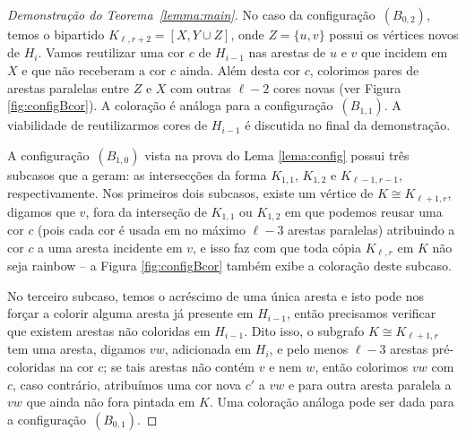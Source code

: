 \documentclass[12pt,a4paper]{book}
\newcommand{\K}{K_{\ell,r}} %
\begin{document}
\begin{proof}[Demonstração do Teorema~\ref{lemma:main}]
	  No caso da configuração~\hyperlink{HconfigB}{$(B_{0,2})$},
   temos  o bipartido $K_{\ell, r+2} = [X, Y \cup Z]$, onde $Z = \{u,v\}$ possui os vértices novos de $H_i$.
   Vamos reutilizar uma cor $c$ de $H_{i-1}$ nas arestas de $u$ e $v$ que incidem em $X$ e que não receberam a cor $c$ ainda.
   Além desta cor $c$, colorimos pares de arestas paralelas entre $Z$ e $X$ com outras $\ell-2$ cores novas (ver Figura \ref{fig:configBcor}).   
        A coloração é análoga para a configuração~\hyperlink{HconfigB}{$(B_{1,1})$}. 
        A viabilidade de reutilizarmos cores de $H_{i-1}$ é discutida no final da demonstração.

        
       A configuração~\hyperlink{HconfigB}{$(B_{1,0})$} vista na prova do Lema \ref{lema:config} possui três subcasos que a geram: 
       as intersecções da forma $K_{1,1}$, $K_{1,2}$ e $K_{\ell-1,r-1}$, respectivamente. 
       Nos primeiros dois subcasos, existe um vértice de $K \cong K_{\ell+1,r}$, digamos que $v$,
        fora da interseção de $K_{1,1}$ ou $K_{1,2}$ em que podemos reusar uma
        cor $c$ (pois cada cor é usada em no máximo $\ell-3$ arestas paralelas) atribuindo a cor $c$ a uma aresta incidente em $v$, e isso faz com que toda cópia $\K$ em $K$ não seja rainbow -- a Figura \ref{fig:configBcor} também exibe a coloração deste subcaso.
                
        No terceiro subcaso, temos o acréscimo de uma única aresta e isto pode nos forçar a colorir alguma aresta já presente em $H_{i-1}$, então precisamos verificar que existem arestas não coloridas em $H_{i-1}$. 
        Dito isso, o subgrafo $K \cong K_{\ell+1,r}$ tem uma aresta, digamos $vw$, adicionada em $H_i$, e pelo menos $\ell-3$ arestas pré-coloridas na cor $c$;
        se tais arestas não contém $v$ e nem $w$, então colorimos $vw$ com $c$, caso contrário, atribuímos uma cor nova $c'$ a $vw$ e para outra aresta paralela a $vw$ que ainda não fora pintada em $K$.  
        Uma coloração análoga pode ser dada para a configuração~\hyperlink{HconfigB}{$(B_{0,1})$}.
        

\end{proof}
\end{document}
